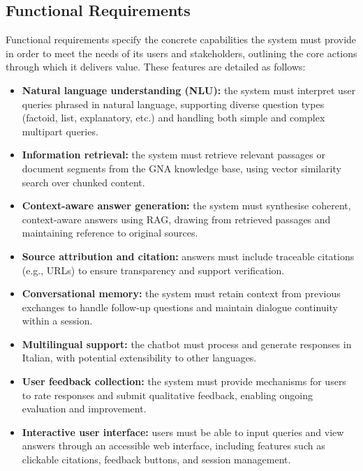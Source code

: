 \begin{spacing}{1.5}
\subsection{Functional Requirements}
Functional requirements specify the concrete capabilities the system must provide in order to meet the needs of its users and stakeholders, outlining the core actions through which it delivers value. These features are detailed as follows:
\begin{itemize}
    \item \textbf{Natural language understanding (NLU):} the system must interpret user queries phrased in natural language, supporting diverse question types (factoid, list, explanatory, etc.) and handling both simple and complex multipart queries.
    \item \textbf{Information retrieval:} the system must retrieve relevant passages or document segments from the GNA knowledge base, using vector similarity search over chunked content.
    \item \textbf{Context-aware answer generation:} the system must synthesise coherent, context-aware answers using RAG, drawing from retrieved passages and maintaining reference to original sources.
    \item \textbf{Source attribution and citation:} answers must include traceable citations (e.g., URLs) to ensure transparency and support verification.
    \item \textbf{Conversational memory:} the system must retain context from previous exchanges to handle follow-up questions and maintain dialogue continuity within a session.
    \item \textbf{Multilingual support:} the chatbot must process and generate responses in Italian, with potential extensibility to other languages.
    \item \textbf{User feedback collection:} the system must provide mechanisms for users to rate responses and submit qualitative feedback, enabling ongoing evaluation and improvement.
    \item \textbf{Interactive user interface:} users must be able to input queries and view answers through an accessible web interface, including features such as clickable citations, feedback buttons, and session management.
\end{itemize}


\end{spacing}
